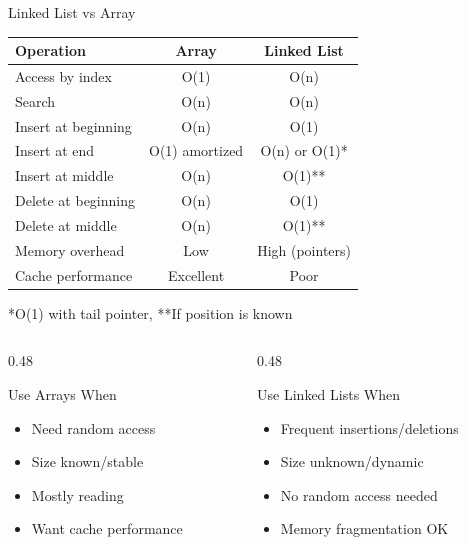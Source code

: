 \documentclass[aspectratio=169,xcolor=dvipsnames]{beamer}
\begin{document}
\begin{frame}{Linked List vs Array}
  \begin{center}
    \begin{tabular}{l|c|c}
      \toprule
      \textbf{Operation} & \textbf{Array} & \textbf{Linked List} \\
      \midrule
      Access by index & O(1) & O(n) \\
      Search & O(n) & O(n) \\
      Insert at beginning & O(n) & O(1) \\
      Insert at end & O(1) amortized & O(n) or O(1)* \\
      Insert at middle & O(n) & O(1)** \\
      Delete at beginning & O(n) & O(1) \\
      Delete at middle & O(n) & O(1)** \\
      Memory overhead & Low & High (pointers) \\
      Cache performance & Excellent & Poor \\
      \bottomrule
    \end{tabular}
  \end{center}

  \tiny{*O(1) with tail pointer, **If position is known}

  \vspace{0.5cm}

  \begin{columns}
    \begin{column}{0.48\textwidth}
      \begin{block}{Use Arrays When}
        \begin{itemize}
          \item Need random access
          \item Size known/stable
          \item Mostly reading
          \item Want cache performance
        \end{itemize}
      \end{block}
    \end{column}
    \begin{column}{0.48\textwidth}
      \begin{block}{Use Linked Lists When}
        \begin{itemize}
          \item Frequent insertions/deletions
          \item Size unknown/dynamic
          \item No random access needed
          \item Memory fragmentation OK
        \end{itemize}
      \end{block}
    \end{column}
  \end{columns}
\end{frame}
\end{document}
